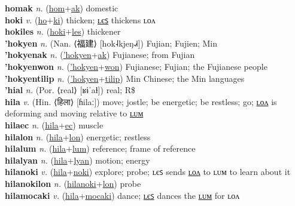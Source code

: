 \textbf{homak} \textit{n.} (\hyperref[hom]{hom}+\hyperref[ak]{ak})
domestic \label{homak} \\
\textbf{hoki} \textit{v.} (\hyperref[ho]{ho}+\hyperref[ki]{ki})
thicken; \hyperref[hokiles]{ʟєꜱ} thickens ʟᴏᴧ \label{hoki} \\
\textbf{hokiles} \textit{n.} (\hyperref[hoki]{hoki}+\hyperref[les]{les})
thickener \label{hokiles} \\
\textbf{'hokyen} \textit{n.} (Nan. ⟨福建⟩ [hok˨kjeŋ˨˩˧])
Fujian; Fujien; Min \label{'hokyen} \\
\textbf{'hokyenak} \textit{n.} (\hyperref['hokyen]{'hokyen}+\hyperref[ak]{ak})
Fujianese; from Fujian \label{'hokyenak} \\
\textbf{'hokyenwon} \textit{n.} (\hyperref['hokyen]{'hokyen}+\hyperref[won]{won})
Fujianese; Fujian; the Fujianese people \label{'hokyenwon} \\
\textbf{'hokyentilip} \textit{n.} (\hyperref['hokyen]{'hokyen}+\hyperref[tilip]{tilip})
Min Chinese; the Min languages \label{'hokyentilip} \\
\textbf{'hial} \textit{n.} (Por. ⟨real⟩ [ʁɨˈaɫ])
real; R\$ \label{'hial} \\
\textbf{hila} \textit{v.} (Hin. ⟨हिला⟩ [ɦilaː])
move; jostle; be energetic; be restless; go; \hyperref[hilalon]{ʟᴏᴧ} is deforming and moving relative to \hyperref[hilalum]{ʟᴜᴍ} \label{hila} \\
\textbf{hilaec} \textit{n.} (\hyperref[hila]{hila}+\hyperref[ec]{ec})
muscle \label{hilaec} \\
\textbf{hilalon} \textit{n.} (\hyperref[hila]{hila}+\hyperref[lon]{lon})
energetic; restless \label{hilalon} \\
\textbf{hilalum} \textit{n.} (\hyperref[hila]{hila}+\hyperref[lum]{lum})
reference; frame of reference \label{hilalum} \\
\textbf{hilalyan} \textit{n.} (\hyperref[hila]{hila}+\hyperref[lyan]{lyan})
motion; energy \label{hilalyan} \\
\textbf{hilanoki} \textit{v.} (\hyperref[hila]{hila}+\hyperref[noki]{noki})
explore; probe; ʟєꜱ sends \hyperref[hilanokilon]{ʟᴏᴧ} to ʟᴜᴍ to learn about it \label{hilanoki} \\
\textbf{hilanokilon} \textit{n.} (\hyperref[hilanoki]{hilanoki}+\hyperref[lon]{lon})
probe \label{hilanokilon} \\
\textbf{hilamocaki} \textit{v.} (\hyperref[hila]{hila}+\hyperref[mocaki]{mocaki})
dance; \hyperref[hilamocakiles]{ʟєꜱ} dances the \hyperref[hilamocakilum]{ʟᴜᴍ} for ʟᴏᴧ \label{hilamocaki} \\
